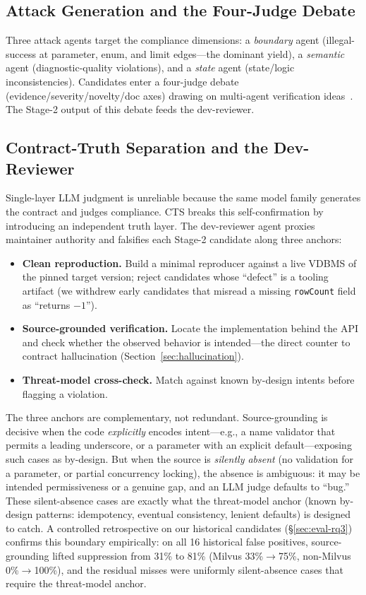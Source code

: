 \documentclass[sigconf, anonymous, review]{acmart}
\begin{document}
\subsection{Attack Generation and the Four-Judge Debate}
Three attack agents target the compliance dimensions: a \emph{boundary} agent (illegal-success at parameter, enum, and limit edges---the dominant yield), a \emph{semantic} agent (diagnostic-quality violations), and a \emph{state} agent (state/logic inconsistencies). Candidates enter a four-judge debate (evidence/severity/novelty/doc axes) drawing on multi-agent verification ideas~\cite{du2023improving}. The Stage-2 output of this debate feeds the dev-reviewer.

\subsection{Contract-Truth Separation and the Dev-Reviewer}\label{sec:cts}
Single-layer LLM judgment is unreliable because the same model family generates the contract and judges compliance. CTS breaks this self-confirmation by introducing an independent truth layer. The dev-reviewer agent proxies maintainer authority and falsifies each Stage-2 candidate along three anchors:
\begin{itemize}[leftmargin=*,itemsep=2pt]
\item \textbf{Clean reproduction.} Build a minimal reproducer against a live VDBMS of the pinned target version; reject candidates whose ``defect'' is a tooling artifact (we withdrew early candidates that misread a missing \texttt{rowCount} field as ``returns $-1$'').
\item \textbf{Source-grounded verification.} Locate the implementation behind the API and check whether the observed behavior is intended---the direct counter to contract hallucination (Section~\ref{sec:hallucination}).
\item \textbf{Threat-model cross-check.} Match against known by-design intents before flagging a violation.
\end{itemize}
The three anchors are complementary, not redundant. Source-grounding is decisive when the code \emph{explicitly} encodes intent---e.g., a name validator that permits a leading underscore, or a parameter with an explicit default---exposing such cases as by-design. But when the source is \emph{silently absent} (no validation for a parameter, or partial concurrency locking), the absence is ambiguous: it may be intended permissiveness or a genuine gap, and an LLM judge defaults to ``bug.'' These silent-absence cases are exactly what the threat-model anchor (known by-design patterns: idempotency, eventual consistency, lenient defaults) is designed to catch. A controlled retrospective on our historical candidates (\S\ref{sec:eval-rq3}) confirms this boundary empirically: on all 16 historical false positives, source-grounding lifted suppression from 31\% to 81\% (Milvus 33\%$\to$75\%, non-Milvus 0\%$\to$100\%), and the residual misses were uniformly silent-absence cases that require the threat-model anchor.
\end{document}
